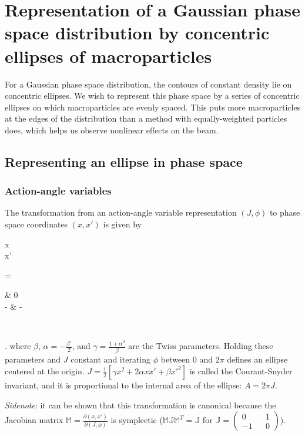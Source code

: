 \chapter{Representation of a Gaussian phase space distribution by concentric ellipses of macroparticles}

For a Gaussian phase space distribution, the contours of constant density lie on concentric ellipses.  We wish to represent this phase space by a series of concentric ellipses on which macroparticles are evenly spaced.  This puts more macroparticles at the edges of the distribution than a method with equally-weighted particles does, which helps us observe nonlinear effects on the beam.

\section{Representing an ellipse in phase space}

\subsection{Action-angle variables}
The transformation from an action-angle variable representation $(J,\phi)$ to phase space coordinates $(x, x')$ is given by
\Begineq
	\begin{pmatrix} x \\ x' \end{pmatrix}
	=  
	\begin{pmatrix} \sqrt{\beta} & 0 \\ -\frac{\alpha}{\sqrt{\beta}} & - \end{pmatrix}
	\begin{pmatrix} \cos\phi \\ \sin\phi \end{pmatrix}.
\Endeq
where $\beta$, $\alpha = -\frac{\beta'}{2}$, and $\gamma = \frac{1+\alpha^2}{\beta}$ are the Twiss parameters.  Holding these parameters and $J$ constant and iterating $\phi$ between $0$ and $2\pi$ defines an ellipse centered at the origin.  $J = \frac{1}{2}[\gamma x^2 + 2 \alpha x x' + \beta x'^2]$ is called the Courant-Snyder invariant, and it is proportional to the internal area of the ellipse: $A = 2\pi J$. 

\textit{Sidenote}: it can be shown that this transformation is canonical because the Jacobian matrix $\mathbb{M} = \frac{\partial(x,x')}{\partial(J,\phi)}$ is symplectic ($\mathbb{M}\mathbb{J}\mathbb{M}^T = \mathbb{J}$ for $\mathbb{J} = (\begin{smallmatrix} 0 && 1 \\ -1 && 0 \end{smallmatrix})$).


